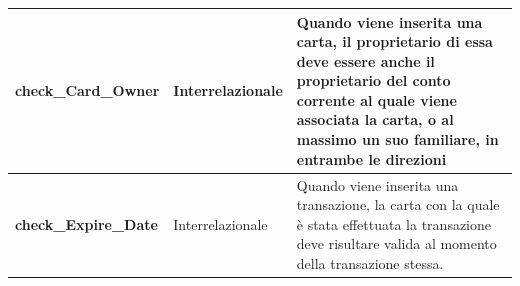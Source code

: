 \begin{longtable}{m{5.2cm}|m{2.8cm}|m{5.3cm}}
    \raggedright \textbf{check\_Card\_Owner} & \raggedright Interrelazionale &
    Quando viene inserita una carta, il proprietario di essa deve essere anche il proprietario del conto corrente al quale viene associata la carta, o al massimo un suo familiare, in entrambe le direzioni \\ \hline

    \raggedright \textbf{check\_Expire\_Date} & \raggedright Interrelazionale &
    Quando viene inserita una transazione, la carta con la quale è stata effettuata la transazione deve risultare valida al momento della transazione stessa. \\ \hline

\end{longtable}